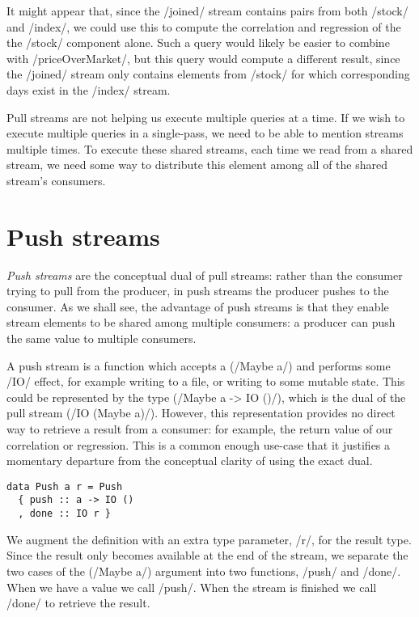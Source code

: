It might appear that, since the \Hs/joined/ stream contains pairs from both \Hs/stock/ and \Hs/index/, we could use this to compute the correlation and regression of the the \Hs/stock/ component alone.
Such a query would likely be easier to combine with \Hs/priceOverMarket/, but this query would compute a different result, since the \Hs/joined/ stream only contains elements from \Hs/stock/ for which corresponding days exist in the \Hs/index/ stream.

Pull streams are not helping us execute multiple queries at a time.
If we wish to execute multiple queries in a single-pass, we need to be able to mention streams multiple times.
To execute these shared streams, each time we read from a shared stream, we need some way to distribute this element among all of the shared stream's consumers.

\section{Push streams}
\label{taxonomy/push}

\emph{Push streams} are the conceptual dual of pull streams: rather than the consumer trying to pull from the producer, in push streams the producer pushes to the consumer.
As we shall see, the advantage of push streams is that they enable stream elements to be shared among multiple consumers: a producer can push the same value to multiple consumers.

A push stream is a function which accepts a (\Hs/Maybe a/) and performs some \Hs/IO/ effect, for example writing to a file, or writing to some mutable state.
This could be represented by the type (\Hs/Maybe a -> IO ()/), which is the dual of the pull stream (\Hs/IO (Maybe a)/).
However, this representation provides no direct way to retrieve a result from a consumer: for example, the return value of our correlation or regression.
This is a common enough use-case that it justifies a momentary departure from the conceptual clarity of using the exact dual.

\begin{lstlisting}
data Push a r = Push
  { push :: a -> IO ()
  , done :: IO r }
\end{lstlisting}

We augment the definition with an extra type parameter, \Hs/r/, for the result type.
Since the result only becomes available at the end of the stream, we separate the two cases of the (\Hs/Maybe a/) argument into two functions, \Hs/push/ and \Hs/done/.
When we have a value we call \Hs/push/.
When the stream is finished we call \Hs/done/ to retrieve the result.


